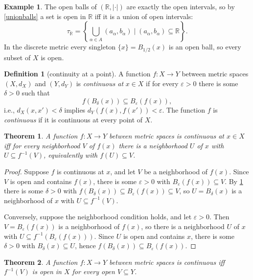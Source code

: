 \documentclass[11pt]{article}
\newtheorem{theorem}{Theorem}[section]
\theoremstyle{definition}
\newtheorem{definition}{Definition}[section]
\newtheorem{example}{Example}[section]
\theoremstyle{remark}
\begin{document}
\begin{example}
    The open balls of $(\mathbb{R}, |\cdot|)$ are exactly the open intervals, so by \cref{unionballs} a set is open in $\mathbb{R}$ iff it is a union of open intervals:
    \[
    \tau_{\mathbb{R}} = \left\{\bigcup_{\alpha \in A} (a_\alpha, b_\alpha) \mid (a_\alpha, b_\alpha) \subseteq \mathbb{R}\right\}.
    \]
    In the discrete metric every singleton $\{x\} = B_{1/2}(x)$ is an open ball, so every subset of $X$ is open.
\end{example}

\begin{definition}[continuity at a point]
    \label{localcontmet}
    A function $f : X \to Y$ between metric spaces $(X, d_X)$ and $(Y, d_Y)$ is \emph{continuous at} $x \in X$ if for every $\varepsilon > 0$ there is some $\delta > 0$ such that
    \[
    f(B_\delta(x)) \subseteq B_\varepsilon(f(x)),
    \]
    i.e., $d_X(x, x') < \delta$ implies $d_Y(f(x), f(x')) < \varepsilon$. The function $f$ is \emph{continuous} if it is continuous at every point of $X$.
\end{definition}

\begin{theorem}
    \label{pointwise}
    A function $f : X \to Y$ between metric spaces is continuous at $x \in X$ iff for every neighborhood $V$ of $f(x)$ there is a neighborhood $U$ of $x$ with $U \subseteq f^{-1}(V)$, equivalently with $f(U) \subseteq V$.
\end{theorem}

\begin{proof}
    Suppose $f$ is continuous at $x$, and let $V$ be a neighborhood of $f(x)$. Since $V$ is open and contains $f(x)$, there is some $\varepsilon > 0$ with $B_\varepsilon(f(x)) \subseteq V$. By \cref{localcontmet} there is some $\delta > 0$ with $f(B_\delta(x)) \subseteq B_\varepsilon(f(x)) \subseteq V$, so $U = B_\delta(x)$ is a neighborhood of $x$ with $U \subseteq f^{-1}(V)$.

    Conversely, suppose the neighborhood condition holds, and let $\varepsilon > 0$. Then $V = B_\varepsilon(f(x))$ is a neighborhood of $f(x)$, so there is a neighborhood $U$ of $x$ with $U \subseteq f^{-1}(B_\varepsilon(f(x)))$. Since $U$ is open and contains $x$, there is some $\delta > 0$ with $B_\delta(x) \subseteq U$, hence $f(B_\delta(x)) \subseteq B_\varepsilon(f(x))$.
\end{proof}

\begin{theorem}
    \label{contpreimage}
    A function $f : X \to Y$ between metric spaces is continuous iff $f^{-1}(V)$ is open in $X$ for every open $V \subseteq Y$.
\end{theorem}
\end{document}
